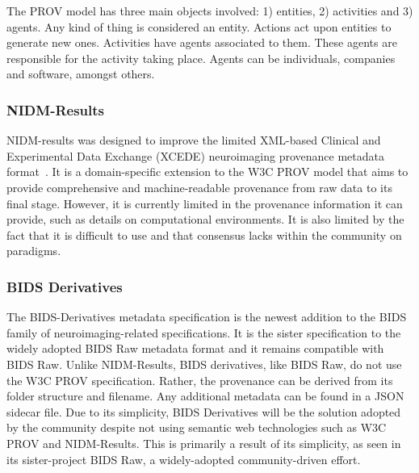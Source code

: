             The PROV model has three main objects involved: 1) entities, 2) 
            activities and 3) agents. Any kind of thing is considered an entity.
            Actions act upon entities to generate new ones. Activities have 
            agents associated to them. These agents are responsible for the 
            activity taking place. Agents can be individuals, companies and 
            software, amongst others.
            
            \subsubsection{NIDM-Results}
                NIDM-results was designed to improve the limited XML-based 
                Clinical and Experimental Data Exchange (XCEDE) neuroimaging
                provenance metadata format~\cite{Maumet:2016aa}. It is a domain-specific extension
                to the W3C PROV model that aims to provide comprehensive and
                machine-readable provenance from raw data to its final stage. %
                However, it is currently limited in the provenance 
                information it can provide, such as details on computational 
                environments. It is also limited by the fact that it is difficult to use and that consensus lacks
                within the community on paradigms. %

            \subsubsection{BIDS Derivatives}
                The BIDS-Derivatives metadata specification is the newest 
                addition to the BIDS family of neuroimaging-related 
                specifications. It is the sister
                specification to the widely adopted BIDS Raw metadata format 
                and it remains compatible with BIDS Raw. 
                Unlike NIDM-Results, BIDS derivatives, like BIDS Raw, do not
                use the W3C PROV specification. Rather, the provenance can be
                derived from its folder structure and filename. Any additional
                metadata can be found in a JSON sidecar file. Due to its simplicity,
                BIDS Derivatives will be the solution adopted by the community 
                despite not using semantic web technologies such as W3C PROV and NIDM-Results.
                This is primarily a result of its simplicity, as seen in its 
                sister-project BIDS Raw, a widely-adopted community-driven effort.
            
